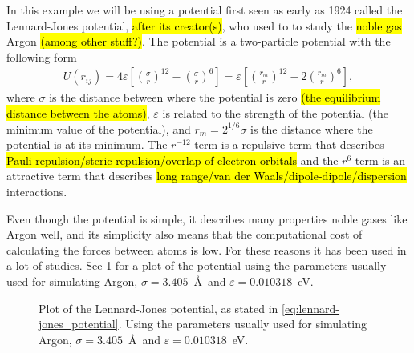 In this example we will be using a potential first seen as early as 1924\cite{jones1924potential} called the Lennard-Jones potential, \hl{after its creator(s)}, who used to to study the \hl{noble gas} Argon \hl{(among other stuff?)}. The potential is a two-particle potential with the following form
\begin{align}
    U(r_{ij}) = 4\varepsilon\left[ \left(\frac{\sigma}{r}\right)^{12} - \left(\frac{\sigma}{r}\right)^{6} \right]
    = \varepsilon\left[ \left(\frac{r_m}{r}\right)^{12} - 2\left(\frac{r_m}{r}\right)^{6} \right],
    \label{eq:lennard-jones_potential}
\end{align}
where $\sigma$ is the distance between where the potential is zero \hl{(the equilibrium distance between the atoms)}, $\varepsilon$ is related to the strength of the potential (the minimum value of the potential), and $r_m = 2^{1/6} \sigma$ is the distance where the potential is at its minimum. The $r^{-12}$-term is a repulsive term that describes \hl{Pauli repulsion/steric repulsion/overlap of electron orbitals} and the $r^{6}$-term is an attractive term that describes \hl{long range/van der Waals/dipole-dipole/dispersion} interactions. 

Even though the potential is simple, it describes many properties noble gases like Argon well, and its simplicity also means that the computational cost of calculating the forces between atoms is low. For these reasons it has been used in a lot of studies. See \cref{fig:lennard-jones_potential} for a plot of the potential using the parameters usually used for simulating Argon\cite{frenkel2001understanding}, $\sigma = 3.405$~\AA\ and $\varepsilon = 0.010318$~eV.
%
\begin{figure}[htpb]%
    \centering%
    \caption{%
        Plot of the Lennard-Jones potential, as stated in \cref{eq:lennard-jones_potential}. Using the parameters usually used for simulating Argon\cite{frenkel2001understanding}, $\sigma = 3.405$~\AA\ and $\varepsilon = 0.010318$~eV.%
        \label{fig:lennard-jones_potential}%
    }%
\end{figure}%

